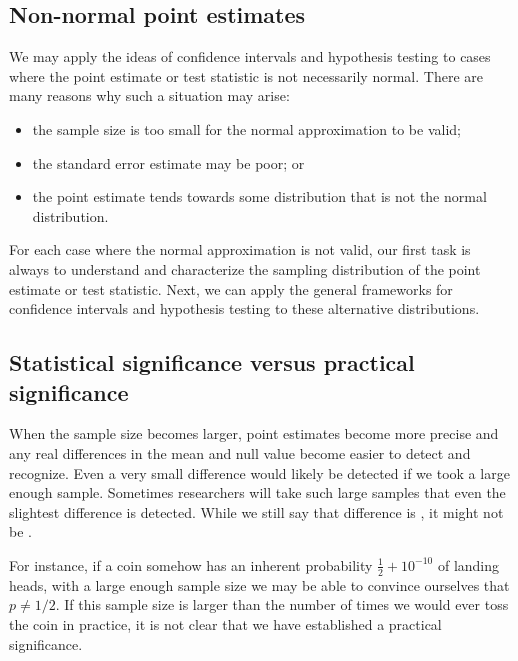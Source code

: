 \subsection{Non-normal point estimates}

	We may apply the ideas of confidence intervals and hypothesis testing to cases where the point estimate or test statistic is not necessarily normal.
	There are many reasons why such a situation may arise:
	\begin{itemize}
		\setlength{\itemsep}{0mm}
		\item the sample size is too small for the normal approximation to be valid;
		\item the standard error estimate may be poor; or
		\item the point estimate tends towards some distribution that is not the normal distribution.
	\end{itemize}
	For each case where the normal approximation is not valid, our first task is always to understand and characterize the sampling distribution of the point estimate or test statistic. Next, we can apply the general frameworks for confidence intervals and hypothesis testing to these alternative distributions.


\subsection{Statistical significance versus practical significance}

	When the sample size becomes larger, point estimates become more precise and
	any real differences in the mean and null value become easier to detect and recognize.
	Even a very small difference would likely be detected if we took a large enough sample.
	Sometimes researchers will take such large samples that even the slightest difference is detected.
	While we still say that difference is , it might not be .

	For instance, if a coin somehow has an inherent probability $\frac12+10^{-10}$ of landing heads,
	with a large enough sample size we may be able to convince ourselves that $p\ne 1/2$.
	If this sample size is larger than the number of times we would ever toss the coin in practice,
	it is not clear that we have established a practical significance.

